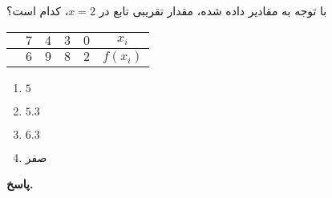 با توجه به مقادیر داده شده، مقدار تقریبی تابع در 
\(x=2\)،
کدام است؟
\begin{center}
	\begin{tabular}{ccccc|c}
		& \(7\) &\(4\)&\(3\) & \(0\) & \(x_i\)\\
		\hline
		& \(6\) & \(9\) & \(8\) &\( 2\) & \(f(x_i)\)
	\end{tabular}
\end{center}
\vspace*{-1.5cm}
\begin{enumerate}
	\item \(5\)
	\item \(5.3\)
	\item \(6.3\)
	\item صفر
\end{enumerate}

\begin{answer}
	
	\textbf{پاسخ.}
	
\end{answer}
